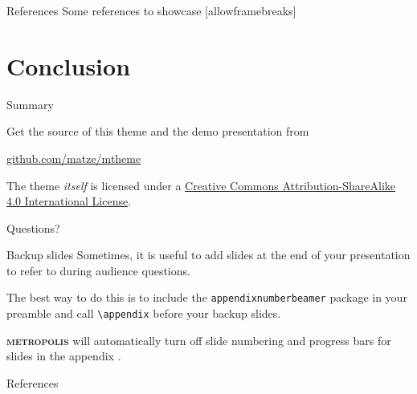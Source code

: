 \documentclass[10pt]{beamer}
\newcommand{\themename}{\textbf{\textsc{metropolis}}\xspace}
\begin{document}
\begin{frame}{References}
    Some references to showcase [allowframebreaks] \cite{knuth92,ConcreteMath,Simpson,Er01,greenwade93}
\end{frame}

\section{Conclusion}

\begin{frame}{Summary}

    Get the source of this theme and the demo presentation from

    \begin{center}\url{github.com/matze/mtheme}\end{center}

    The theme \emph{itself} is licensed under a
    \href{http://creativecommons.org/licenses/by-sa/4.0/}{Creative Commons
    Attribution-ShareAlike 4.0 International License}.

    \begin{center}\ccbysa\end{center}

\end{frame}

{
\begin{frame}[standout]
    Questions?
\end{frame}
}

\appendix

\begin{frame}[fragile]{Backup slides}
    Sometimes, it is useful to add slides at the end of your presentation to
    refer to during audience questions.

    The best way to do this is to include the \verb|appendixnumberbeamer|
    package in your preamble and call \verb|\appendix| before your backup slides.

    \themename will automatically turn off slide numbering and progress bars for
    slides in the appendix \cite{Rosa2017}.
\end{frame}

\begin{frame}[allowframebreaks]{References}

    

\end{frame}
\end{document}
